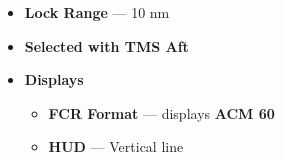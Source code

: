 \begin{tcoloritemize}
{\begin{itemize}
\begin{itemize}
            \item centered 23 deg above gun cross
            \item useful during turning engagement to lock target ``across the circle''
        \end{itemize}
        \item \textbf{Lock Range} --- 10 nm
        \item \textbf{Selected with TMS Aft}
        \item \textbf{Displays}
        \begin{itemize}
            \item \textbf{FCR Format} --- displays \textbf{ACM 60}
            \item \textbf{HUD} --- Vertical line
        \end{itemize}
    \end{itemize}}
\end{tcoloritemize}

\marginfigeometry

